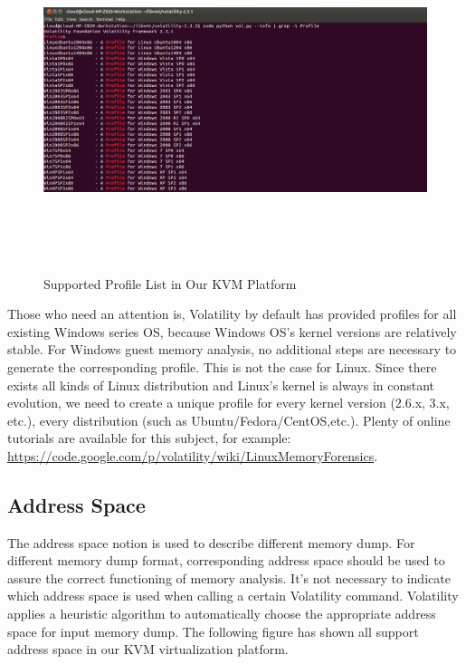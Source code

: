 \begin{figure}[htbp]
	\centering
		\includegraphics[width=14cm, height= 10cm ]{Figures/Figure27.png}
	\caption[Supported Profile List in Our KVM Platform]{Supported Profile List in Our KVM Platform}
	\label{fig:Supported Profile List in Our KVM Platform}
\end{figure}

Those who need an attention is, Volatility by default has provided profiles for all existing Windows series OS, 
because Windows OS’s kernel versions are relatively stable. For Windows guest memory analysis, no additional steps are necessary to 
generate the corresponding profile. This is not the case for Linux. Since there exists all kinds of Linux distribution and Linux’s 
kernel is always in constant evolution, we need to create a unique profile for every kernel version (2.6.x, 3.x, etc.), every 
distribution (such as Ubuntu/Fedora/CentOS,etc.). Plenty of online tutorials are available for this subject, for example: 
\url{https://code.google.com/p/volatility/wiki/LinuxMemoryForensics}.

\subsection{Address Space}
The address space notion is used to describe different memory dump. 
For different memory dump format, corresponding address space should be used to assure the correct functioning of memory analysis. 
It’s not necessary to indicate which address space is used when calling a certain Volatility command. 
Volatility applies a heuristic algorithm to automatically choose the appropriate address space for input memory dump. 
The following figure has shown all support address space in our KVM virtualization platform.

